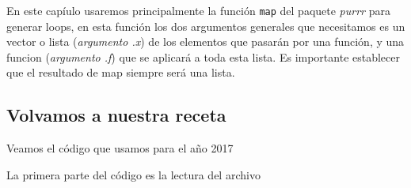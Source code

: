 \documentclass[]{book}
\newenvironment{Shaded}{\begin{snugshade}}{\end{snugshade}}
\newcommand{\DataTypeTok}[1]{\textcolor[rgb]{0.13,0.29,0.53}{#1}}
\newcommand{\DecValTok}[1]{\textcolor[rgb]{0.00,0.00,0.81}{#1}}
\newcommand{\KeywordTok}[1]{\textcolor[rgb]{0.13,0.29,0.53}{\textbf{#1}}}
\newcommand{\NormalTok}[1]{#1}
\newcommand{\OperatorTok}[1]{\textcolor[rgb]{0.81,0.36,0.00}{\textbf{#1}}}
\newcommand{\OtherTok}[1]{\textcolor[rgb]{0.56,0.35,0.01}{#1}}
\newcommand{\StringTok}[1]{\textcolor[rgb]{0.31,0.60,0.02}{#1}}
\begin{document}
En este capíulo usaremos principalmente la función \texttt{map} del
paquete \emph{purrr} para generar loops, en esta función los dos
argumentos generales que necesitamos es un vector o lista
(\emph{argumento .x}) de los elementos que pasarán por una función, y
una funcion (\emph{argumento .f}) que se aplicará a toda esta lista. Es
importante establecer que el resultado de map siempre será una lista.

\hypertarget{volvamos-a-nuestra-receta}{%
\subsection{Volvamos a nuestra receta}\label{volvamos-a-nuestra-receta}}

Veamos el código que usamos para el año 2017

\begin{Shaded}
\end{Shaded}

La primera parte del código es la lectura del archivo
\end{document}
